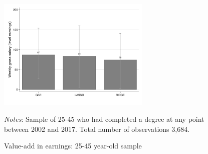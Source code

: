 \documentclass[12pt, a4paper]{article}
\begin{document}
\begin{figure}[H]
\centering
\caption{Value-add in earnings: 25-45 year-old sample}
\vspace{0.5cm}
  \label{fig:valadle46}
    \includegraphics[width=0.65\textwidth]{_figures/valad_levearn_46.pdf}
\parbox{1\textwidth}{\footnotesize{\textit{Notes}: Sample of 25-45 who had completed a degree at any point between 2002 and 2017. Total number of observations 3,684.}}
\end{figure}
\end{document}
